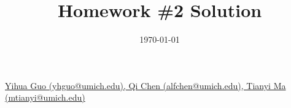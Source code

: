 \documentclass{amsart}
\theoremstyle{definition}
\theoremstyle{remark}
\numberwithin{equation}{section}
\begin{document}
\title{Homework \#2 Solution}
	
\date{\today}

\maketitle

 \href{mailto:yhguo@umich.edu,alfchen@umich.edu,mtianyi@umich.edu}
{Yihua Guo (yhguo@umich.edu), 
Qi Chen (alfchen@umich.edu),
Tianyi Ma (mtianyi@umich.edu)}

\bigskip







\end{document}
